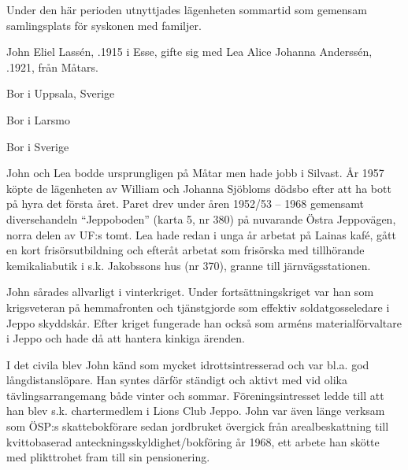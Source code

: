 Under den här perioden utnyttjades lägenheten sommartid som gemensam samlingsplats för syskonen med familjer.\jhvspace{}


John Eliel Lassén, .1915 i Esse, gifte sig med Lea Alice Johanna Anderssén, .1921, från Måtars.
\begin{jhchildren}
  \item {} Bor i Uppsala, Sverige
  \item {} Bor i Larsmo
  \item {}
  \item {} Bor i Sverige
  \item {}
\end{jhchildren}

John och Lea bodde ursprungligen på Måtar men hade jobb i Silvast. År 1957 köpte de lägenheten av William och Johanna Sjöbloms dödsbo efter att ha bott på hyra det första året. Paret drev under åren 1952/53 -- 1968 gemensamt diversehandeln ``Jeppoboden'' (karta 5, nr 380) på nuvarande Östra Jeppovägen, norra delen av UF:s tomt. Lea hade redan i unga år arbetat på Lainas kafé, gått en kort frisörsutbildning och efteråt arbetat som frisörska med tillhörande kemikaliabutik i s.k. Jakobssons hus (nr 370), granne till järnvägsstationen.

John sårades allvarligt i vinterkriget. Under fortsättningskriget var han som krigsveteran på hemmafronten och tjänstgjorde som effektiv soldatgosseledare i Jeppo skyddskår. Efter kriget fungerade han också som arméns materialförvaltare i Jeppo och hade då att hantera kinkiga ärenden.

I det civila blev John känd som mycket idrottsintresserad och var bl.a. god långdistanslöpare. Han syntes därför ständigt och aktivt med vid olika tävlingsarrangemang både vinter och sommar. Föreningsintresset ledde till att han blev s.k. chartermedlem i Lions Club Jeppo. John var även länge verksam som ÖSP:s  skattebokförare sedan jordbruket övergick från arealbeskattning till kvittobaserad anteckningsskyldighet/bokföring år 1968, ett arbete han skötte med plikttrohet fram till sin pensionering.


